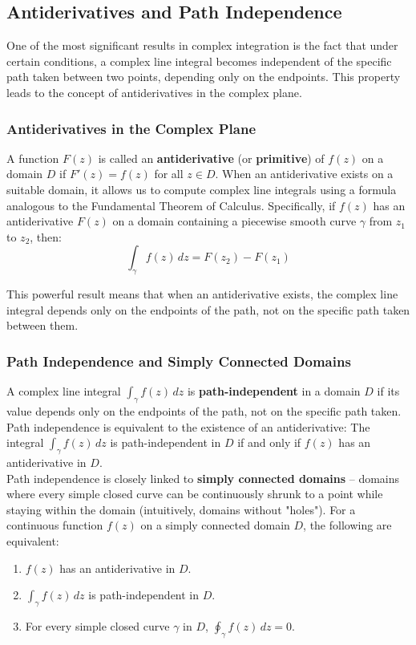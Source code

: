 \subsection*{Antiderivatives and Path Independence}  

\noindent One of the most significant results in complex integration is the fact that under certain conditions, a complex line integral becomes independent of the specific path taken between two points, depending only on the endpoints. This property leads to the concept of antiderivatives in the complex plane.

\subsubsection*{Antiderivatives in the Complex Plane}

\noindent A function $F(z)$ is called an \textbf{antiderivative} (or \textbf{primitive}) of $f(z)$ on a domain $D$ if $F'(z) = f(z)$ for all $z \in D$. When an antiderivative exists on a suitable domain, it allows us to compute complex line integrals using a formula analogous to the Fundamental Theorem of Calculus. Specifically, if $f(z)$ has an antiderivative $F(z)$ on a domain containing a piecewise smooth curve $\gamma$ from $z_1$ to $z_2$, then:
\[
\int_{\gamma} f(z) \, dz = F(z_2) - F(z_1)
\]

\noindent This powerful result means that when an antiderivative exists, the complex line integral depends only on the endpoints of the path, not on the specific path taken between them.

\subsubsection*{Path Independence and Simply Connected Domains}

\noindent A complex line integral $\int_{\gamma} f(z) \, dz$ is \textbf{path-independent} in a domain $D$ if its value depends only on the endpoints of the path, not on the specific path taken. Path independence is equivalent to the existence of an antiderivative: The integral $\int_{\gamma} f(z) \, dz$ is path-independent in $D$ if and only if $f(z)$ has an antiderivative in $D$. \\

\noindent Path independence is closely linked to \textbf{simply connected domains} – domains where every simple closed curve can be continuously shrunk to a point while staying within the domain (intuitively, domains without "holes"). For a continuous function $f(z)$ on a simply connected domain $D$, the following are equivalent:
\begin{enumerate}
\item $f(z)$ has an antiderivative in $D$.
\item $\int_{\gamma} f(z) \, dz$ is path-independent in $D$.
\item For every simple closed curve $\gamma$ in $D$, $\oint_{\gamma} f(z) \, dz = 0$.
\end{enumerate}


